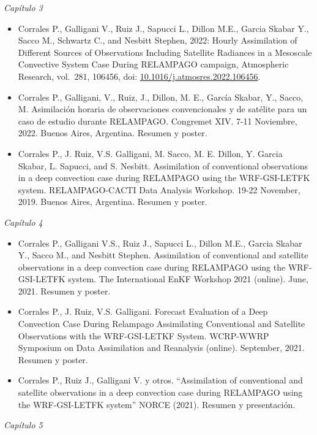 \documentclass[12pt,oneside,a4paper]{reedthesis}
\providecommand{\tightlist}{%
  \setlength{\itemsep}{0pt}\setlength{\parskip}{0pt}}
\begin{document}
\emph{Capítulo 3}
\begin{itemize}
\tightlist
\item
  Corrales P., Galligani V., Ruiz J., Sapucci L., Dillon M.E., Garcia Skabar Y., Sacco M., Schwartz C., and Nesbitt Stephen, 2022: Hourly Assimilation of Different Sources of Observations Including Satellite Radiances in a Mesoscale Convective System Case During RELAMPAGO campaign, Atmospheric Research, vol.~281, 106456, doi: \href{doi:10.1016/j.atmosres.2022.106456}{10.1016/j.atmosres.2022.106456}.
\item
  Corrales P., Galligani, V., Ruiz, J., Dillon, M. E., García Skabar, Y., Sacco, M. Asimilación horaria de observaciones convencionales y de satélite para un caso de estudio durante RELAMPAGO. Congremet XIV. 7-11 Noviembre, 2022. Buenos Aires, Argentina. Resumen y poster.
\item
  Corrales P., J. Ruiz, V.S. Galligani, M. Sacco, M. E. Dillon, Y. Garcia Skabar, L. Sapucci, and S. Nesbitt. Assimilation of conventional observations in a deep convection case during RELAMPAGO using the WRF-GSI-LETFK system. RELAMPAGO-CACTI Data Analysis Workshop. 19-22 November, 2019. Buenos Aires, Argentina. Resumen y poster.
\end{itemize}
\emph{Capítulo 4}
\begin{itemize}
\tightlist
\item
  Corrales P., Galligani V.S., Ruiz J., Sapucci L., Dillon M.E., Garcia Skabar Y., Sacco M., and Nesbitt Stephen. Assimilation of conventional and satellite observations in a deep convection case during RELAMPAGO using the WRF-GSI-LETFK system. The International EnKF Workshop 2021 (online). June, 2021. Resumen y poster.
\item
  Corrales P., J. Ruiz, V.S. Galligani. Forecast Evaluation of a Deep Convection Case During Relampago Assimilating Conventional and Satellite Observations with the WRF-GSI-LETKF System. WCRP-WWRP Symposium on Data Assimilation and Reanalysis (online). September, 2021. Resumen y poster.
\item
  Corrales P., Ruiz J., Galligani V. y otros. ``Assimilation of conventional and satellite observations in a deep convection case during RELAMPAGO using the WRF-GSI-LETFK system'' NORCE (2021). Resumen y presentación.
\end{itemize}
\emph{Capítulo 5}
\end{document}

